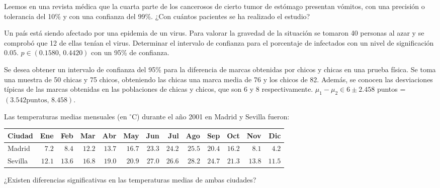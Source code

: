 {Leemos en una revista médica que la cuarta parte de los cancerosos de cierto tumor de estómago presentan vómitos, con
una precisión o tolerancia del 10\% y con una confianza del 99\%.
¿Con cuántos pacientes se ha realizado el estudio?
}
{}
{}


{Un país está siendo afectado por una epidemia de un virus.
Para valorar la gravedad de la situación se tomaron 40 personas al azar y se comprobó que 12 de ellas tenían el virus.
Determinar el intervalo de confianza para el porcentaje de infectados con un nivel de significación $0.05$.
}
{
$p\in (0.1580,\,0.4420)$ con un 95\% de confianza.
}
{}


{Se desea obtener un intervalo de confianza del 95\% para la diferencia de marcas obtenidas por chicos y chicas en una
prueba física.
Se toma una muestra de 50 chicas y 75 chicos, obteniendo las chicas una marca media de 76 y los chicos de 82.
Además, se conocen las desviaciones típicas de las marcas obtenidas en las poblaciones de chicas y chicos, que son 6 y
8 respectivamente.
}
{
$\mu_1-\mu_2 \in 6\pm 2.458$ puntos = $(3.542\text{puntos},\,8.458)$.
}
{}


{Las temperaturas medias mensuales (en $^\circ$C) durante el año 2001 en Madrid y Sevilla fueron:
\begin{center}
\begin{tabular}{|l|r|r|r|r|r|r|r|r|r|r|r|r|}
\hline
Ciudad &    Ene &    Feb &    Mar &    Abr &    May &    Jun &    Jul &    Ago &    Sep &    Oct &    Nov &    Dic \\
\hline
 Madrid                  &  $7.2$ &  $8.4$ & $12.2$ & $13.7$ & $16.7$ & $23.3$ & $24.2$ & $25.5$ & $20.4$ & $16.2$ &  $8.1$ &  $4.2$ \\
\hline
 Sevilla                 & $12.1$ & $13.6$ & $16.8$ & $19.0$ & $20.9$ & $27.0$ & $26.6$ & $28.2$ & $24.7$ & $21.3$ & $13.8$ & $11.5$ \\
\hline
\end{tabular}
\end{center}
¿Existen diferencias significativas en las temperaturas medias de ambas ciudades?
}
{}
{}


